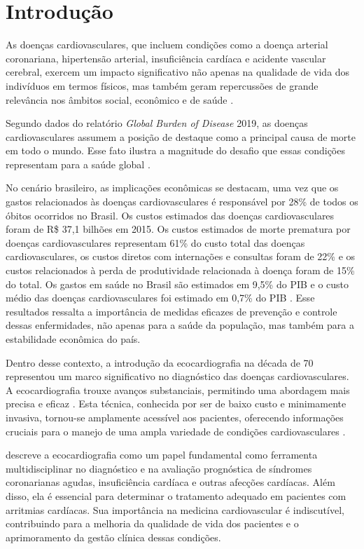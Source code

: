 \chapter{Introdução}
\label{cap:introducao}

As doenças cardiovasculares, que incluem condições como a doença arterial coronariana, hipertensão arterial, insuficiência cardíaca e acidente vascular cerebral, exercem um impacto significativo não apenas na qualidade de vida dos indivíduos em termos físicos, mas também geram repercussões de grande relevância nos âmbitos social, econômico e de saúde \cite{Stevens2018}.

Segundo dados do relatório \textit{Global Burden of Disease} 2019, as doenças cardiovasculares assumem a posição de destaque como a principal causa de morte em todo o mundo. Esse fato ilustra a magnitude do desafio que essas condições representam para a saúde global \cite{https://doi.org/10.6069/1d4y-yq37}.

No cenário brasileiro, as implicações econômicas se destacam, uma vez que os gastos relacionados às doenças cardiovasculares  é responsável por 28\% de todos os óbitos ocorridos no Brasil. Os custos estimados das doenças cardiovasculares foram de R\$ 37,1 bilhões em 2015. Os custos estimados de morte prematura por doenças cardiovasculares representam 61\% do custo total das doenças cardiovasculares, os custos diretos com internações e consultas foram de 22\% e os custos relacionados à perda de produtividade relacionada à doença foram de 15\% do total. Os gastos em saúde no Brasil são estimados em 9,5\% do PIB e o custo médio das doenças cardiovasculares foi estimado em 0,7\% do PIB
\cite{Siqueira2017}. Esse resultados ressalta a importância de medidas eficazes de prevenção e controle dessas enfermidades, não apenas para a saúde da população, mas também para a estabilidade econômica do país.

Dentro desse contexto, a introdução da ecocardiografia na década de 70 representou um marco significativo no diagnóstico das doenças cardiovasculares. A ecocardiografia trouxe avanços substanciais, permitindo uma abordagem mais precisa e eficaz \cite{haley_2018}. Esta técnica, conhecida por ser de baixo custo e minimamente invasiva, tornou-se amplamente acessível aos pacientes, oferecendo informações cruciais para o manejo de uma ampla variedade de condições cardiovasculares \cite{Mancuso2014}.

 \textcite{Mancuso2014} descreve a ecocardiografia como um papel fundamental como ferramenta multidisciplinar no diagnóstico e na avaliação prognóstica de síndromes coronarianas agudas, insuficiência cardíaca e outras afecções cardíacas. Além disso, ela é essencial para determinar o tratamento adequado em pacientes com arritmias cardíacas. Sua importância na medicina cardiovascular é indiscutível, contribuindo para a melhoria da qualidade de vida dos pacientes e o aprimoramento da gestão clínica dessas condições.

